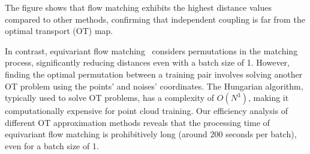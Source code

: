 The figure shows that flow matching exhibits the highest distance values compared to other methods, confirming that independent coupling is far from the optimal transport (OT) map.
%

%

In contrast, equivariant flow matching~\cite{klein2024equivariant} considers permutations in the matching process, significantly reducing distances even with a batch size of 1.
%
However, finding the optimal permutation between a training pair involves solving another OT problem using the points' and noises' coordinates.
%
The Hungarian algorithm, typically used to solve OT problems, has a complexity of $O(N^3)$, making it computationally expensive for point cloud training.
%
Our efficiency analysis of different OT approximation methods reveals that the processing time of equivariant flow matching is prohibitively long (around 200 seconds per batch), even for a batch size of 1.
\fi

